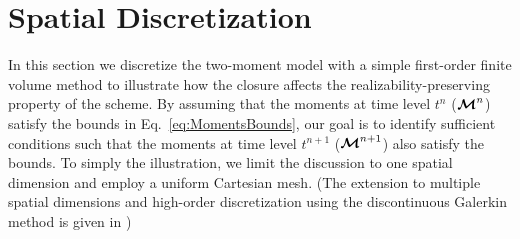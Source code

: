 \section{Spatial Discretization}\label{se:SpacialDiscretization}

In this section we discretize the two-moment model with a simple first-order finite volume method to illustrate how the closure affects the realizability-preserving property of the scheme.  
By assuming that the moments at time level $t^{n}$ ($\boldsymbol{\mathcal{M}}^{n}$) satisfy the bounds in Eq.~\eqref{eq:MomentsBounds}, our goal is to identify sufficient conditions such that the moments at time level $t^{n+1}$ ($\boldsymbol{\mathcal{M}}^{n+1}$) also satisfy the bounds.  
To simply the illustration, we limit the discussion to one spatial dimension and employ a uniform Cartesian mesh.  
(The extension to multiple spatial dimensions and high-order discretization using the discontinuous Galerkin method is given in \cite{chu_etal_2018})

